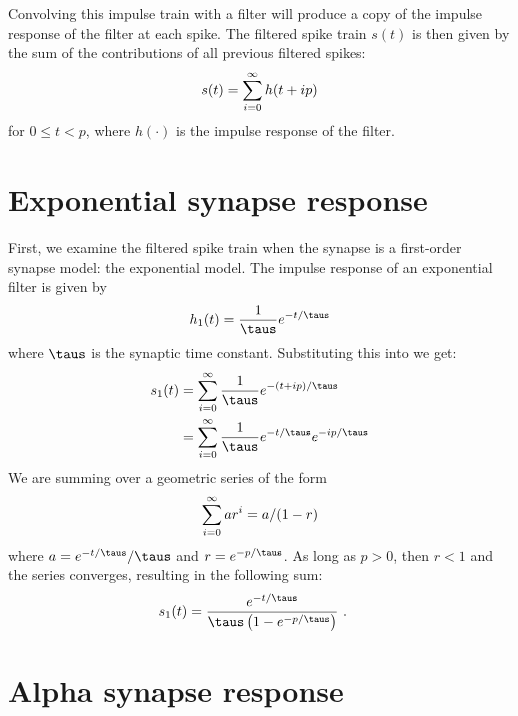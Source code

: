 \begin{appendices}
Convolving this impulse train with a filter
will produce a copy of the impulse response of the filter at each spike.
The filtered spike train $s(t)$ is then given by
the sum of the contributions of all previous filtered spikes:
\begin{align}
  s(t) = \sum\limits_{i=0}^\infty h(t + ip)
  \eqnlabel{filteredspikes}
\end{align}
for $0 \le t < p$,
where $h(\cdot)$ is the impulse response of the filter.


\section{Exponential synapse response}

First, we examine the filtered spike train
when the synapse is a first-order synapse model: the exponential model.
The impulse response of an exponential filter is given by
\begin{align}
  h_1(t) = \frac{1}{\taus} e^{-t / \taus}
\end{align}
where $\taus$ is the synaptic time constant.
Substituting this into  we get:
\begin{align}
  s_1(t) &= \sum\limits_{i=0}^\infty \frac{1}{\taus} e^{-(t + ip) / \taus} \\
         &= \sum\limits_{i=0}^\infty \frac{1}{\taus} e^{-t/\taus} e^{-ip/\taus}
\end{align}
We are summing over a geometric series of the form
\begin{align}
  \sum\limits_{i=0}^\infty a r^i = a / (1 - r)
  \eqnlabel{geometric}
\end{align}
where $a = e^{-t/\taus} / \taus$ and $r = e^{-p/\taus}$.
As long as $p > 0$, then $r < 1$ and the series converges,
resulting in the following sum:
\begin{align}
  s_1(t) &= \frac{e^{-t/\taus}}{\taus \left(1 - e^{-p/\taus}\right)} \text{ .}
  \eqnlabel{lowpass-series}
\end{align}


\section{Alpha synapse response}


\end{appendices}
